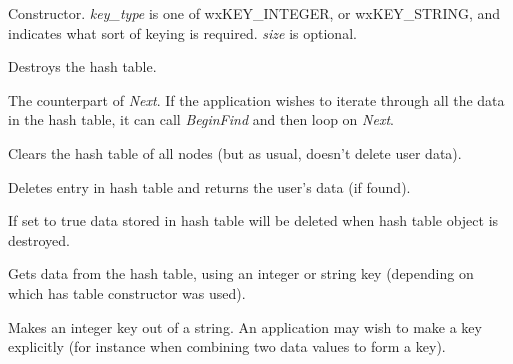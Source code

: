 

Constructor. {\it key\_type} is one of wxKEY\_INTEGER, or wxKEY\_STRING,
and indicates what sort of keying is required. {\it size} is optional.



Destroys the hash table.



The counterpart of {\it Next}.  If the application wishes to iterate
through all the data in the hash table, it can call {\it BeginFind} and
then loop on {\it Next}.



Clears the hash table of all nodes (but as usual, doesn't delete user data).




Deletes entry in hash table and returns the user's data (if found).



If set to true data stored in hash table will be deleted when hash table object
is destroyed.





Gets data from the hash table, using an integer or string key (depending on which
has table constructor was used).



Makes an integer key out of a string. An application may wish to make a key
explicitly (for instance when combining two data values to form a key).


